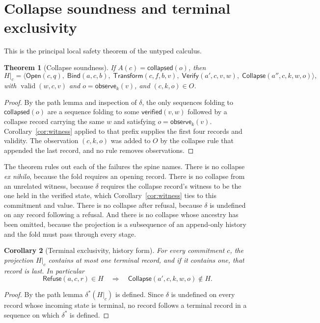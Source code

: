 \documentclass[11pt,openany]{book}
\newtheorem{theorem}{Theorem}[chapter]
\newtheorem{corollary}[theorem]{Corollary}
\theoremstyle{remark}
\newcommand{\Refuse}{\mathsf{Refuse}}
\newcommand{\Bind}{\mathsf{Bind}}
\newcommand{\Transform}{\mathsf{Transform}}
\newcommand{\Verify}{\mathsf{Verify}}
\newcommand{\Collapse}{\mathsf{Collapse}}
\newcommand{\valid}{\operatorname{valid}}
\begin{document}
\section{Collapse soundness and terminal exclusivity}
\label{sec:collapse}

This is the principal local safety theorem of the untyped calculus.

\begin{theorem}[Collapse soundness]\label{thm:collapse}
If $A(c)=\mathsf{collapsed}(o)$, then
\[
H|_c=\langle \mathsf{Open}(c,q),\;\Bind(a,c,b),\;
\Transform(c,f,b,v),\;\Verify(a',c,v,w),\;
\Collapse(a'',c,k,w,o)\rangle,
\]
with $\valid(w,c,v)$ and $o=\mathsf{observe}_k(v)$, and $(c,k,o)\in O$.
\end{theorem}

\begin{proof}
By the path lemma and inspection of $\delta$, the only sequences folding
to $\mathsf{collapsed}(o)$ are a sequence folding to some
$\mathsf{verified}(v,w)$ followed by a collapse record carrying the same
$w$ and satisfying $o=\mathsf{observe}_k(v)$. Corollary~\ref{cor:witness}
applied to that prefix supplies the first four records and validity. The
observation $(c,k,o)$ was added to $O$ by the collapse rule that appended
the last record, and no rule removes observations.
\end{proof}

The theorem rules out each of the failures the spine names. There is no
collapse \emph{ex nihilo}, because the fold requires an opening record.
There is no collapse from an unrelated witness, because $\delta$ requires
the collapse record's witness to be the one held in the verified state,
which Corollary~\ref{cor:witness} ties to this commitment and value. There
is no collapse after refusal, because $\delta$ is undefined on any record
following a refusal. And there is no collapse whose ancestry has been
omitted, because the projection is a subsequence of an append-only
history and the fold must pass through every stage.

\begin{corollary}[Terminal exclusivity, history form]
\label{cor:terminal-history}
For every commitment $c$, the projection $H|_c$ contains at most one
terminal record, and if it contains one, that record is last. In
particular
\[
\Refuse(a,c,r)\in H
\quad\Longrightarrow\quad
\Collapse(a',c,k,w,o)\notin H.
\]
\end{corollary}

\begin{proof}
By the path lemma $\delta^{*}(H|_c)$ is defined. Since $\delta$ is
undefined on every record whose incoming state is terminal, no record
follows a terminal record in a sequence on which $\delta^{*}$ is defined.
\end{proof}
\end{document}
